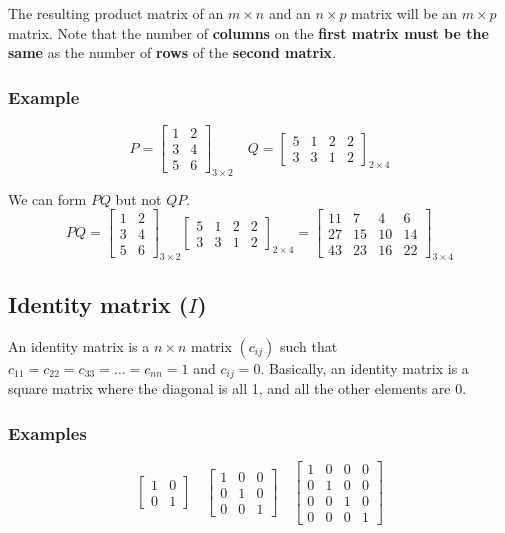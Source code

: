 \documentclass[11pt]{article}
\begin{document}
The resulting product matrix of an \(m \times n\) and an \(n \times p\) matrix will be an \(m \times p\) matrix. Note that the number of \textbf{columns} on the \textbf{first matrix must be the same} as the number of \textbf{rows} of the \textbf{second matrix}.
\subsubsection{Example}
\label{sec:org820169f}
\begin{displaymath}
P = \begin{bmatrix}
1 & 2 \\
3 & 4 \\
5 & 6
\end{bmatrix}_{3 \times 2} \quad Q = \begin{bmatrix}
5 & 1 & 2 & 2 \\
3 & 3 & 1 & 2
\end{bmatrix}_{2 \times 4}
\end{displaymath}

We can form \(PQ\) but not \(QP\).
\begin{displaymath}
PQ = \begin{bmatrix}
1 & 2 \\
3 & 4 \\
5 & 6
\end{bmatrix}_{3 \times 2} \begin{bmatrix}
5 & 1 & 2 & 2 \\
3 & 3 & 1 & 2
\end{bmatrix}_{2 \times 4} = \begin{bmatrix}
11 & 7 & 4 & 6 \\
27 & 15 & 10 & 14 \\
43 & 23 & 16 & 22
\end{bmatrix}_{3 \times 4}
\end{displaymath}
\subsection{Identity matrix (\(I\))}
\label{sec:orgc159088}
An identity matrix is a \(n \times n\) matrix \((c_{ij})\) such that \(c_{11} = c_{22} = c_{33} = \ldots = c_{nn} = 1\) and \(c_{ij} = 0\). Basically, an identity matrix is a square matrix where the diagonal is all 1, and all the other elements are 0.
\subsubsection{Examples}
\label{sec:orgd43e452}
\begin{displaymath}
\begin{bmatrix}
1 & 0 \\
0 & 1
\end{bmatrix} \quad \begin{bmatrix}
1 & 0 & 0 \\
0 & 1 & 0 \\
0 & 0 & 1
\end{bmatrix} \quad \begin{bmatrix}
1 & 0 & 0 & 0 \\
0 & 1 & 0 & 0 \\
0 & 0 & 1 & 0 \\
0 & 0 & 0 & 1
\end{bmatrix}
\end{displaymath}
\end{document}
